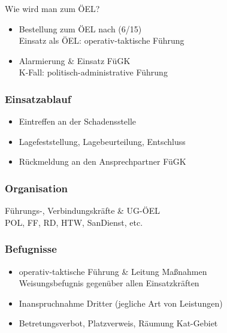 \begin{warningbox}{Wie wird man zum ÖEL?}
    \begin{itemize}
        \item Bestellung zum ÖEL nach (6/15)\\
        \ra Einsatz als ÖEL: operativ-taktische Führung
        \item Alarmierung \& Einsatz FüGK\\
        \ra K-Fall: politisch-administrative Führung
    \end{itemize}
\end{warningbox}
\begin{normbox}{\subsubsection{Einsatzablauf}}
    \begin{itemize}
        \item Eintreffen an der Schadensstelle
        \item Lagefeststellung, Lagebeurteilung, Entschluss
        \item Rückmeldung an den Ansprechpartner FüGK
    \end{itemize}
\end{normbox}
\begin{normbox}{\subsubsection{Organisation}}
    Führungs-, Verbindungskräfte \& UG-ÖEL\\
    \ra POL, FF, RD, HTW, SanDienst, etc. 
\end{normbox}
\begin{normbox}{\subsubsection{Befugnisse}}
    \begin{itemize}
        \item operativ-taktische Führung \& Leitung Maßnahmen\\
        \ra Weisungsbefugnis gegenüber allen Einsatzkräften
        \item Inanspruchnahme Dritter (jegliche Art von Leistungen)
        \item Betretungsverbot, Platzverweis, Räumung Kat-Gebiet
    \end{itemize}
\end{normbox}

